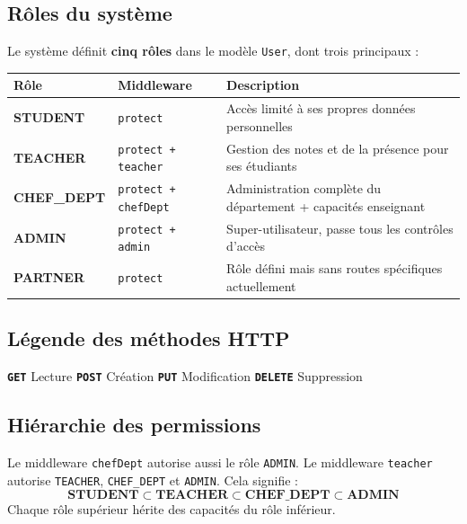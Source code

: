 \documentclass[12pt,a4paper]{article}
\newcommand{\httpmethod}[1]{%
  \ifstrequal{#1}{GET}{\colorbox{blue!15}{\texttt{\bfseries\color{blue!70!black}GET}}}{}%
  \ifstrequal{#1}{POST}{\colorbox{green!18}{\texttt{\bfseries\color{green!60!black}POST}}}{}%
  \ifstrequal{#1}{PUT}{\colorbox{orange!18}{\texttt{\bfseries\color{orange!70!black}PUT}}}{}%
  \ifstrequal{#1}{DELETE}{\colorbox{red!15}{\texttt{\bfseries\color{red!70!black}DELETE}}}{}%
}
\begin{document}
\subsection{Rôles du système}

Le système définit \textbf{cinq rôles} dans le modèle \texttt{User}, dont trois principaux :

\begin{center}
\begin{tabular}{llp{8cm}}
  \toprule
  \textbf{Rôle} & \textbf{Middleware} & \textbf{Description} \\
  \midrule
  \textbf{STUDENT}     & \texttt{protect}             & Accès limité à ses propres données personnelles \\
  \textbf{TEACHER}     & \texttt{protect + teacher}    & Gestion des notes et de la présence pour ses étudiants \\
  \textbf{CHEF\_DEPT}  & \texttt{protect + chefDept}   & Administration complète du département + capacités enseignant \\
  \textbf{ADMIN}       & \texttt{protect + admin}      & Super-utilisateur, passe tous les contrôles d'accès \\
  \textbf{PARTNER}     & \texttt{protect}              & Rôle défini mais sans routes spécifiques actuellement \\
  \bottomrule
\end{tabular}
\end{center}

\subsection{Légende des méthodes HTTP}

\begin{center}
  \httpmethod{GET} Lecture \qquad
  \httpmethod{POST} Création \qquad
  \httpmethod{PUT} Modification \qquad
  \httpmethod{DELETE} Suppression
\end{center}

\subsection{Hiérarchie des permissions}

\begin{infobox}
  Le middleware \texttt{chefDept} autorise aussi le rôle \texttt{ADMIN}.
  Le middleware \texttt{teacher} autorise \texttt{TEACHER}, \texttt{CHEF\_DEPT} et \texttt{ADMIN}.
  Cela signifie :
  \[
    \textbf{STUDENT} \subset \textbf{TEACHER} \subset \textbf{CHEF\_DEPT} \subset \textbf{ADMIN}
  \]
  Chaque rôle supérieur hérite des capacités du rôle inférieur.
\end{infobox}
\end{document}
